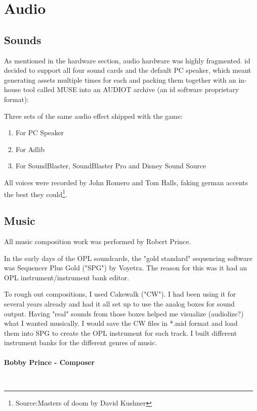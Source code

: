 \documentclass[book.tex]{subfiles}
\begin{document}
\section{Audio}

\subsection{Sounds}
As mentioned in the hardware section, audio hardware was highly fragmented. id decided to support all four sound cards and the default PC speaker, which meant generating assets multiple times for each and packing them together with an in-house tool called MUSE into an AUDIOT archive (an id software proprietary format):\\
\begin{figure}[H]
\centering
 \end{figure}
 \par
 Three sets of the same audio effect shipped with the game:
\begin{enumerate}
\item For PC Speaker
\item For Adlib
\item For SoundBlaster, SoundBlaster Pro and Disney Sound Source
\end{enumerate}

\par
All voices were recorded by John Romero and Tom Halls, faking german accents the best they could\footnote{Source:Masters of doom by David Kushner}.






\subsection{Music}
All music composition work was performed by Robert Prince.\\
\par
 \begin{fancyquotes}
In the early days of the OPL soundcards, the "gold standard" sequencing software was Sequencer Plus Gold ("SPG") by Voyetra. The reason for this was it had an OPL instrument/instrument bank editor.\\
\par
To rough out compositions, I used Cakewalk ("CW"). I had been using it for several years already and had it all set up to use the analog boxes for sound output. Having "real" sounds from those boxes helped me visualize (audiolize?) what I wanted musically. I would save the CW files in *.mid format and load them into SPG to create the OPL instrument for each track. I built different instrument banks for the different genres of music.\\
   \\
\textbf{Bobby Prince - Composer}
 \end{fancyquotes}\\
\end{document}
